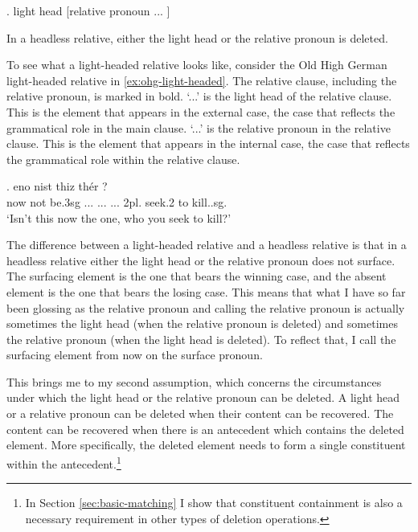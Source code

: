 \ex. light head [relative pronoun ... ]\label{ex:light+rel}

In a headless relative, either the light head or the relative pronoun is deleted.

To see what a light-headed relative looks like, consider the Old High German light-headed relative in \ref{ex:ohg-light-headed}. The relative clause, including the relative pronoun, is marked in bold.
 `...' is the light head of the relative clause. This is the element that appears in the external case, the case that reflects the grammatical role in the main clause.
 `...' is the relative pronoun in the relative clause. This is the element that appears in the internal case, the case that reflects the grammatical role within the relative clause.

\exg. eno nist thiz thér    
 ?\\
 now {not be.3\ac{sg}}\scsub{[nom]} ... ...
 ... 2\ac{pl}. seek.2\scsub{[acc]} to kill..\ac{sg}.\\
 `Isn't this now the one, who you seek to kill?' \label{ex:ohg-light-headed}

The difference between a light-headed relative and a headless relative is that in a headless relative either the light head or the relative pronoun does not surface.
The surfacing element is the one that bears the winning case, and the absent element is the one that bears the losing case. This means that what I have so far been glossing as the relative pronoun and calling the relative pronoun is actually sometimes the light head (when the relative pronoun is deleted) and sometimes the relative pronoun (when the light head is deleted). To reflect that, I call the surfacing element from now on the surface pronoun.

This brings me to my second assumption, which concerns the circumstances under which the light head or the relative pronoun can be deleted. A light head or a relative pronoun can be deleted when their content can be recovered. The content can be recovered when there is an antecedent which contains the deleted element. More specifically, the deleted element needs to form a single constituent within the antecedent.\footnote{
In Section \ref{sec:basic-matching} I show that constituent containment is also a necessary requirement in other types of deletion operations.
}

